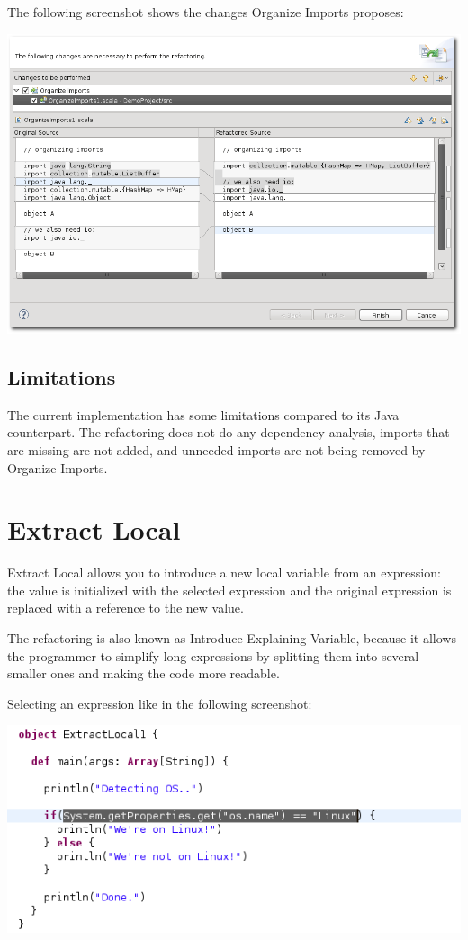 \documentclass[10pt,a4paper,oneside]{scrreprt}
\begin{document}
The following screenshot shows the changes Organize Imports proposes:

\begin{center}
  \includegraphics[width=\linewidth]{organize_screenshot_1.png}
\end{center}

\subsection{Limitations}

The current implementation has some limitations compared to its Java counterpart. The refactoring does not do any dependency analysis, imports that are missing are not added, and unneeded imports are not being removed by Organize Imports. 

\section{Extract Local}

Extract Local allows you to introduce a new local variable from an expression: the value is initialized with the selected expression and the original  expression is replaced with a reference to the new value. 

The refactoring is also known as Introduce Explaining Variable, because it allows the programmer to simplify long expressions by splitting them into several smaller ones and making the code more readable. 

Selecting an expression like in the following screenshot:

\begin{center}
  \includegraphics[width=0.8\linewidth]{extract_local_screenshot_2.png}
\end{center}
\end{document}
